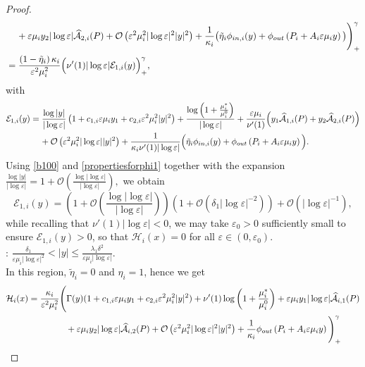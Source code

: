 \documentclass[11pt,reqno,a4paper]{amsart}
\numberwithin{equation}{section}
\newcommand{\ve}{\varepsilon}
\begin{document}
\begin{proof}
\begin{equation*}
\begin{aligned}
&\hspace{4mm}+\ve\mu_i y_2 |\log\ve| \widehat{\mathcal{A}}_{2,i}(P)
+\mathcal{O}\left(\ve^2\mu_i^2|\log\ve|^2|y|^2\right)+\frac{1}{\kappa_i}\big(\tilde{\eta}_i\phi_{in,i}(y)+\phi_{out}\left(P_i+A_i\ve\mu_i y\right)\big)\Bigg)^{\gamma}_{+}\\
&=\frac{\left(1-\tilde{\eta}_i\right)\kappa_i}{\ve^2\mu_i^2}\Big(\nu'(1)|\log\ve|\mathcal{E}_{1,i}(y)\Big)^{\gamma}_{+},
\end{aligned}
\end{equation*}
with
\begin{equation*}
\begin{aligned}
\mathcal{E}_{1,i}(y)&=\frac{\log|y|}{|\log\ve|}\left(1+c_{1,i}\ve\mu_iy_1+c_{2,i}\ve^2\mu_i^2|y|^2\right)+\frac{\log\left(1+\frac{\mu_i^{*}}{\mu_i^0}\right)}{|\log\ve|}+\frac{\ve\mu_i}{\nu'(1)}\Big(y_1\widehat{\mathcal{A}}_{1,i}(P)+y_2\widehat{\mathcal{A}}_{2,i}(P)\Big)\\
&\hspace{4mm}+\mathcal{O}\left(\ve^2\mu_i^2|\log\ve||y|^2\right)+\frac{1}{\kappa_i\nu'(1)|\log\ve|}\Big(\tilde{\eta}_{i}\phi_{in,i}(y)+\phi_{out}\left(P_i+A_i\ve\mu_i y\right)\Big).
\end{aligned}
\end{equation*}
Using \eqref{b100} and \eqref{propertiesforphi1} together with the expansion $\frac{\log|y|}{|\log\ve|}= 1+\mathcal{O}\left(\frac{\log|\log\ve|}{|\log\ve|}\right),$ we obtain \[\mathcal{E}_{1,i}(y)=\left(1+\mathcal{O}\left(\frac{\log|\log\ve|}{|\log\ve|}\right)\right)\left(1+\mathcal{O}\left(\delta_1|\log\ve|^{-2}\right)\right)+\mathcal{O}\left(|\log\ve|^{-1}\right),\] while recalling that $\nu'(1)|\log\ve|<0$, we may take  $\ve_0>0$ sufficiently small to ensure $\mathcal{E}_{1,i}(y)>0$, so that $\mathcal{H}_i(x)=0$ for all $\ve\in(0,\ve_0)$. 
\\
: $\frac{\delta_1}{\ve\mu_i|\log\ve|^2} < |y| \leq \frac{\lambda_1\delta^2}{\ve\mu_i|\log\ve|}$. 
\\
In this region, $\tilde{\eta}_i=0$ and $\eta_i=1$, hence we get 
\begin{equation*}
\begin{aligned}
\mathcal{H}_i(x)&=\frac{\kappa_i}{\ve^2\mu_i^2}\Bigg(\Gamma(y)(1+c_{1,i}\ve\mu_i y_1 +c_{2,i}\ve^2\mu_i^2|y|^2)+\nu'(1)\log\left(1+\frac{\mu_i^{*}}{\mu_i^{0}}\right)+\ve\mu_iy_1|\log\ve|\widehat{\mathcal{A}}_{i,1}(P)\\
&\hspace{15mm}+\ve\mu_i y_2 |\log\ve| \widehat{\mathcal{A}}_{i,2}(P)+\mathcal{O}\left(\ve^2\mu_i^2|\log\ve|^2|y|^2\right)+\frac{1}{\kappa_i}\phi_{out}\left(P_i+A_i\ve\mu_i y\right)\Bigg)^{\gamma}_{+}

\end{aligned}
\end{equation*}
\end{proof}
\end{document}
